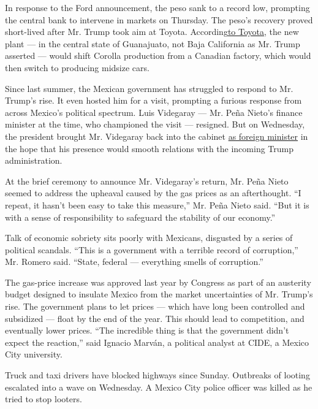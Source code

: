 In response to the Ford announcement, the peso sank to a record low,
prompting the central bank to intervene in markets on Thursday. The
peso's recovery proved short-lived after Mr. Trump took aim at Toyota.
According\href{http://pressroom.toyota.com/releases/toyota+manufacturing+billion+mexico+corolla.htm}{to
Toyota}, the new plant --- in the central state of Guanajuato, not Baja
California as Mr. Trump asserted --- would shift Corolla production from
a Canadian factory, which would then switch to producing midsize cars.

Since last summer, the Mexican government has struggled to respond to
Mr. Trump's rise. It even hosted him for a visit, prompting a furious
response from across Mexico's political spectrum. Luis Videgaray --- Mr.
Peña Nieto's finance minister at the time, who championed the visit ---
resigned. But on Wednesday, the president brought Mr. Videgaray back
into the cabinet
\href{https://www.nytimes.com/2017/01/04/world/americas/mexico-united-states-trump-pena-nieto-videgaray.html?rref=collection\%2Ftimestopic\%2FMexico\&action=click\&contentCollection=world\&region=stream\&module=stream_unit\&version=latest\&contentPlacement=1\&pgtype=collection}{as
foreign minister} in the hope that his presence would smooth relations
with the incoming Trump administration.

At the brief ceremony to announce Mr. Videgaray's return, Mr. Peña Nieto
seemed to address the upheaval caused by the gas prices as an
afterthought. ``I repeat, it hasn't been easy to take this measure,''
Mr. Peña Nieto said. ``But it is with a sense of responsibility to
safeguard the stability of our economy.''

Talk of economic sobriety sits poorly with Mexicans, disgusted by a
series of political scandals. ``This is a government with a terrible
record of corruption,'' Mr. Romero said. ``State, federal --- everything
smells of corruption.''

The gas-price increase was approved last year by Congress as part of an
austerity budget designed to insulate Mexico from the market
uncertainties of Mr. Trump's rise. The government plans to let prices
--- which have long been controlled and subsidized --- float by the end
of the year. This should lead to competition, and eventually lower
prices. ``The incredible thing is that the government didn't expect the
reaction,'' said Ignacio Marván, a political analyst at CIDE, a Mexico
City university.

Truck and taxi drivers have blocked highways since Sunday. Outbreaks of
looting escalated into a wave on Wednesday. A Mexico City police officer
was killed as he tried to stop looters.

